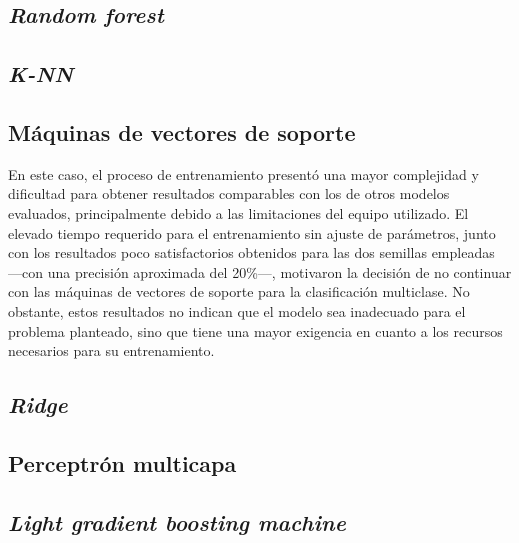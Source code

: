 \subsection{\textit{Random forest}}
\label{subsec:rf_multi}



\subsection{\textit{K-NN}}
\label{subsec:knn_multi}



\subsection{Máquinas de vectores de soporte}
\label{subsec:svm_multi}

En este caso, el proceso de entrenamiento presentó una mayor complejidad y dificultad para obtener resultados comparables con los de otros modelos evaluados, principalmente debido a las limitaciones del equipo utilizado. El elevado tiempo requerido para el entrenamiento sin ajuste de parámetros, junto con los resultados poco satisfactorios obtenidos para las dos semillas empleadas ---con una precisión aproximada del 20\%---, motivaron la decisión de no continuar con las máquinas de vectores de soporte para la clasificación multiclase. No obstante, estos resultados no indican que el modelo sea inadecuado para el problema planteado, sino que tiene una mayor exigencia en cuanto a los recursos necesarios para su entrenamiento.

\subsection{\textit{Ridge}}
\label{subsec:ridge_multi}



\subsection{Perceptrón multicapa}
\label{subsec:mlp_multi}



\subsection{\textit{Light gradient boosting machine}}
\label{subsec:lgbm_multi}

